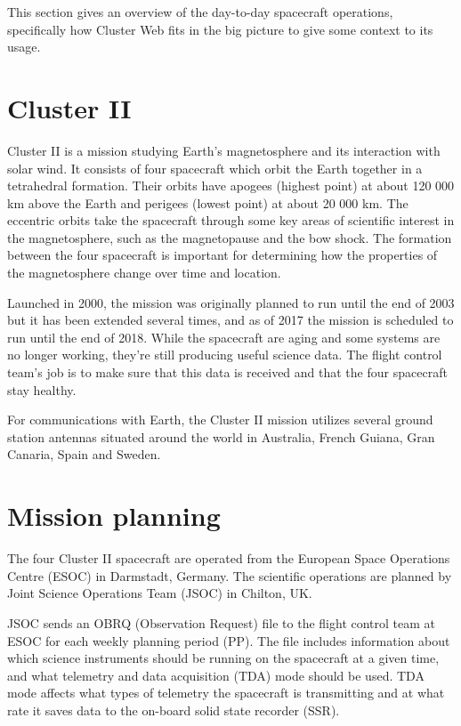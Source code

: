
This section gives an overview of the day-to-day spacecraft operations, specifically how Cluster Web fits in the big picture to give some context to its usage.

\section{Cluster II}
Cluster II is a mission studying Earth's magnetosphere and its interaction with solar wind. It consists of four spacecraft which orbit the Earth together in a tetrahedral formation. Their orbits have apogees (highest point) at about 120 000 km above the Earth and perigees (lowest point) at about 20 000 km. The eccentric orbits take the spacecraft through some key areas of scientific interest in the magnetosphere, such as the magnetopause and the bow shock. The formation between the four spacecraft is important for determining how the properties of the magnetosphere change over time and location.

Launched in 2000, the mission was originally planned to run until the end of 2003 but it has been extended several times, and as of 2017 the mission is scheduled to run until the end of 2018. While the spacecraft are aging and some systems are no longer working, they're still producing useful science data. The flight control team's job is to make sure that this data is received and that the four spacecraft stay healthy.

For communications with Earth, the Cluster II mission utilizes several ground station antennas situated around the world in Australia, French Guiana, Gran Canaria, Spain and Sweden.

\cite{escoubet2001introduction, esasci, esacluster}

\section{Mission planning}

The four Cluster II spacecraft are operated from the European Space Operations Centre (ESOC) in Darmstadt, Germany. The scientific operations are planned by Joint Science Operations Team (JSOC) in Chilton, UK.

JSOC sends an OBRQ (Observation Request) file to the flight control team at ESOC for each weekly planning period (PP). The file includes information about which science instruments should be running on the spacecraft at a given time, and what telemetry and data acquisition (TDA) mode should be used. TDA mode affects what types of telemetry the spacecraft is transmitting and at what rate it saves data to the on-board solid state recorder (SSR).

